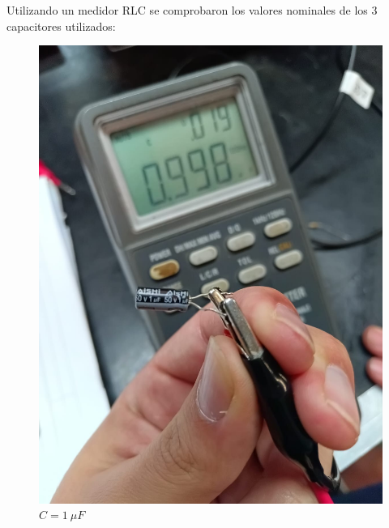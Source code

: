 Utilizando un medidor RLC se comprobaron los valores nominales de los 3 capacitores utilizados:

\begin{figure}[H]
\centering
    \begin{minipage}{0.29\textwidth}
    \centering
    \includegraphics[width=\textwidth,trim={0cm 10cm 0cm 0cm},clip]{Imagenes/MedCap3Exp2.jpeg}
    \caption*{$C=1~\mu F$}
    \end{minipage}
    \hspace*{\fill}
    \begin{minipage}{0.29\textwidth}
    \centering

\end{minipage}
\end{figure}
